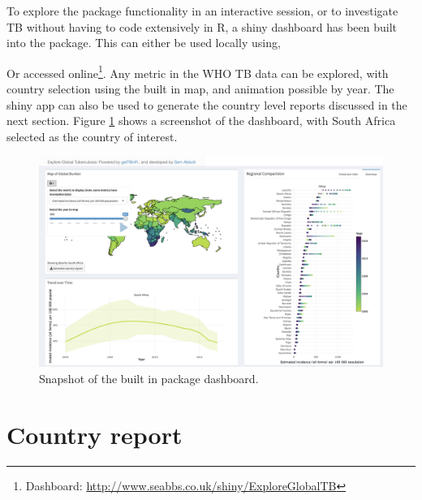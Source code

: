 \documentclass[11pt,twoside]{bristolthesis}
\begin{document}
  To explore the package functionality in an interactive session, or to investigate TB without having to code extensively in R, a shiny dashboard has been built into the package. This can either be used locally using,
  \begin{Shaded}
  \begin{Highlighting}[]
  \NormalTok{()}
  \end{Highlighting}
  \end{Shaded}
  Or accessed online\footnote{Dashboard: \url{http://www.seabbs.co.uk/shiny/ExploreGlobalTB}}. Any metric in the WHO TB data can be explored, with country selection using the built in map, and animation possible by year. The shiny app can also be used to generate the country level reports discussed in the next section. Figure \ref{fig:dash-snapshot} shows a screenshot of the dashboard, with South Africa selected as the country of interest.
  \begin{figure}
  
  {\centering \includegraphics[width=0.8\linewidth]{chapters/getTBinR/img/ExploreGlobalTB} 
  
  }
  
  \caption{Snapshot of the built in package dashboard.}\label{fig:dash-snapshot}
  \end{figure}
  \hypertarget{country-report}{%
  \section{Country report}\label{country-report}}
  
\end{document}
